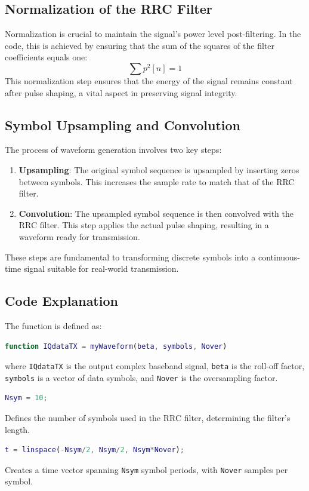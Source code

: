\documentclass{article}
\begin{document}
\subsection{Normalization of the RRC Filter}
Normalization is crucial to maintain the signal's power level post-filtering. In the code, this is achieved by ensuring that the sum of the squares of the filter coefficients equals one:
\[ \sum p^2[n] = 1 \]
This normalization step ensures that the energy of the signal remains constant after pulse shaping, a vital aspect in preserving signal integrity.

\subsection{Symbol Upsampling and Convolution}
The process of waveform generation involves two key steps:
\begin{enumerate}
    \item \textbf{Upsampling}: The original symbol sequence is upsampled by inserting zeros between symbols. This increases the sample rate to match that of the RRC filter.
    \item \textbf{Convolution}: The upsampled symbol sequence is then convolved with the RRC filter. This step applies the actual pulse shaping, resulting in a waveform ready for transmission.
\end{enumerate}
These steps are fundamental to transforming discrete symbols into a continuous-time signal suitable for real-world transmission.


\subsection{Code Explanation}
The function is defined as:
\begin{lstlisting}[language=Matlab]
function IQdataTX = myWaveform(beta, symbols, Nover)
\end{lstlisting}
where \texttt{IQdataTX} is the output complex baseband signal, \texttt{beta} is the roll-off factor, \texttt{symbols} is a vector of data symbols, and \texttt{Nover} is the oversampling factor.

\begin{lstlisting}[language=Matlab]
Nsym = 10;
\end{lstlisting}
Defines the number of symbols used in the RRC filter, determining the filter's length.

\begin{lstlisting}[language=Matlab]
t = linspace(-Nsym/2, Nsym/2, Nsym*Nover);
\end{lstlisting}
Creates a time vector spanning \texttt{Nsym} symbol periods, with \texttt{Nover} samples per symbol.
\end{document}
